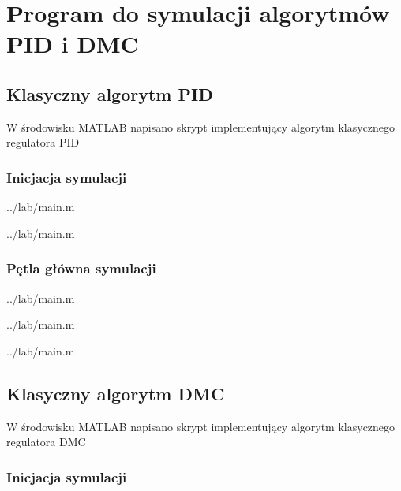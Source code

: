 \section{Program do symulacji algorytmów PID i DMC}
\label{projekt:zad3}

\subsection{Klasyczny algorytm PID}
\label{projekt:zad3:PID:program}

W środowisku MATLAB napisano skrypt implementujący algorytm klasycznego regulatora PID

\subsubsection{Inicjacja symulacji}


    {../lab/main.m}


    {../lab/main.m}
\newpage


\subsubsection{Pętla główna symulacji}


    {../lab/main.m}


    {../lab/main.m}


    {../lab/main.m}
\newpage

\subsection{Klasyczny algorytm DMC}
\label{projekt:zad3:DMC:program}

W środowisku MATLAB napisano skrypt implementujący algorytm klasycznego regulatora DMC

\subsubsection{Inicjacja symulacji}


